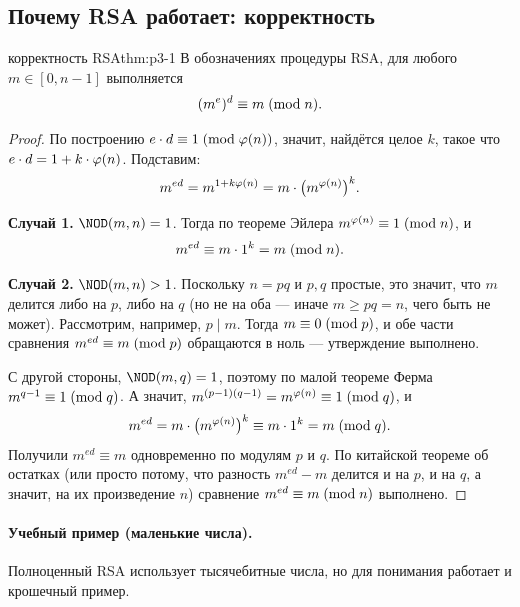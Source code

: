 \subsection{Почему RSA работает: корректность}

\begin{theorem}{корректность RSA}{thm:p3-1}
В обозначениях процедуры RSA, для любого $m \in [0, n-1]$ выполняется
\[
(m^e)^d \equiv m \;(\mathrm{mod}\;n).
\]
\end{theorem}

\begin{proof}
По построению $e\cdot d \equiv 1 \;(\mathrm{mod}\;\varphi(n))$, значит, найдётся целое $k$, такое что $e\cdot d = 1 + k\cdot \varphi(n)$. Подставим:
\[
m^{ed} = m^{1 + k\varphi(n)} = m\cdot \bigl(m^{\varphi(n)}\bigr)^k.
\]

\textbf{Случай 1.} $\NOD(m, n) = 1$. Тогда по теореме Эйлера $m^{\varphi(n)} \equiv 1 \;(\mathrm{mod}\;n)$, и
\[
m^{ed} \equiv m\cdot 1^k = m \;(\mathrm{mod}\;n).
\]

\textbf{Случай 2.} $\NOD(m, n) > 1$. Поскольку $n = pq$ и $p, q$ простые, это значит, что $m$ делится либо на $p$, либо на $q$ (но не на оба --- иначе $m \ge pq = n$, чего быть не может). Рассмотрим, например, $p \mid m$. Тогда $m \equiv 0 \;(\mathrm{mod}\;p)$, и обе части сравнения $m^{ed} \equiv m \;(\mathrm{mod}\;p)$ обращаются в ноль --- утверждение выполнено.

С другой стороны, $\NOD(m, q) = 1$, поэтому по малой теореме Ферма $m^{q-1} \equiv 1 \;(\mathrm{mod}\;q)$. А значит, $m^{(p-1)(q-1)} = m^{\varphi(n)} \equiv 1 \;(\mathrm{mod}\;q)$, и
\[
m^{ed} = m\cdot \bigl(m^{\varphi(n)}\bigr)^k \equiv m\cdot 1^k = m \;(\mathrm{mod}\;q).
\]
Получили $m^{ed} \equiv m$ одновременно по модулям $p$ и $q$. По китайской теореме об остатках (или просто потому, что разность $m^{ed} - m$ делится и на $p$, и на $q$, а значит, на их произведение $n$) сравнение $m^{ed} \equiv m \;(\mathrm{mod}\;n)$ выполнено. \qedhere
\end{proof}

\paragraph*{Учебный пример (маленькие числа).} Полноценный RSA использует тысячебитные числа, но для понимания работает и крошечный пример.

